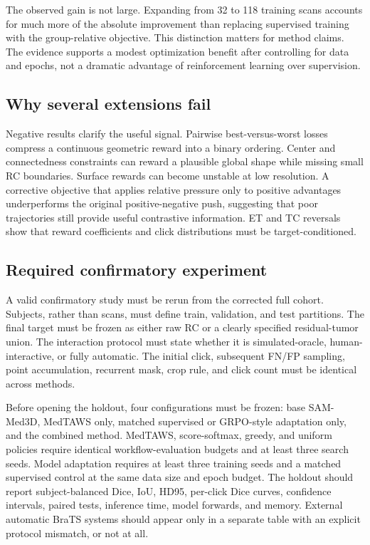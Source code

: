 \documentclass[10pt]{article}
\begin{document}
The observed gain is not large. Expanding from 32 to 118 training scans accounts for much more of the absolute improvement than replacing supervised training with the group-relative objective. This distinction matters for method claims. The evidence supports a modest optimization benefit after controlling for data and epochs, not a dramatic advantage of reinforcement learning over supervision.

\subsection{Why several extensions fail}
Negative results clarify the useful signal. Pairwise best-versus-worst losses compress a continuous geometric reward into a binary ordering. Center and connectedness constraints can reward a plausible global shape while missing small RC boundaries. Surface rewards can become unstable at low resolution. A corrective objective that applies relative pressure only to positive advantages underperforms the original positive-negative push, suggesting that poor trajectories still provide useful contrastive information. ET and TC reversals show that reward coefficients and click distributions must be target-conditioned.

\subsection{Required confirmatory experiment}
A valid confirmatory study must be rerun from the corrected full cohort. Subjects, rather than scans, must define train, validation, and test partitions. The final target must be frozen as either raw RC or a clearly specified residual-tumor union. The interaction protocol must state whether it is simulated-oracle, human-interactive, or fully automatic. The initial click, subsequent FN/FP sampling, point accumulation, recurrent mask, crop rule, and click count must be identical across methods.

Before opening the holdout, four configurations must be frozen: base SAM-Med3D, MedTAWS only, matched supervised or GRPO-style adaptation only, and the combined method. MedTAWS, score-softmax, greedy, and uniform policies require identical workflow-evaluation budgets and at least three search seeds. Model adaptation requires at least three training seeds and a matched supervised control at the same data size and epoch budget. The holdout should report subject-balanced Dice, IoU, HD95, per-click Dice curves, confidence intervals, paired tests, inference time, model forwards, and memory. External automatic BraTS systems should appear only in a separate table with an explicit protocol mismatch, or not at all.
\end{document}
